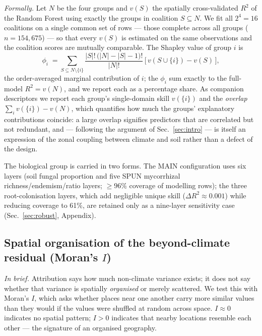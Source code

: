 \textit{Formally.} Let $N$ be the four groups and $v(S)$ the spatially
cross-validated $R^2$ of the Random Forest using exactly the groups in coalition
$S\subseteq N$. We fit all $2^{4}=16$ coalitions on a single common set of rows ---
those complete across all groups ($n=154{,}675$) --- so that every $v(S)$ is
estimated on the same observations and the coalition scores are mutually
comparable. The Shapley value of group $i$ is
\begin{equation}
  \phi_i \;=\!\! \sum_{S\subseteq N\setminus\{i\}}
  \frac{|S|!\,\bigl(|N|-|S|-1\bigr)!}{|N|!}\,
  \bigl[\,v(S\cup\{i\})-v(S)\,\bigr],
  \label{eq:shapley}
\end{equation}
the order-averaged marginal contribution of $i$; the $\phi_i$ sum exactly to the
full-model $R^2=v(N)$, and we report each as a percentage share. As companion
descriptors we report each group's single-domain skill $v(\{i\})$ and the
\emph{overlap} $\sum_i v(\{i\}) - v(N)$, which quantifies how much the groups'
explanatory contributions coincide: a large overlap signifies predictors that are
correlated but not redundant, and --- following the argument of
Sec.~\ref{sec:intro} --- is itself an expression of the zonal coupling between
climate and soil rather than a defect of the design.

The biological group is carried in two forms. The MAIN configuration uses six
layers (soil fungal proportion and five SPUN mycorrhizal
richness/endemism/ratio layers; $\geq96\%$ coverage of modelling rows); the three
\citet{Barcelo2023} root-colonisation layers, which add negligible unique skill
($\Delta R^2\approx0.001$) while reducing coverage to 61\%, are retained only as a
nine-layer sensitivity case (Sec.~\ref{sec:robust}, Appendix).

\subsection{Spatial organisation of the beyond-climate residual (Moran's $I$)}
\label{sec:moran}
\textit{In brief.} Attribution says how much non-climate variance exists; it does
not say whether that variance is spatially \emph{organised} or merely scattered.
We test this with Moran's $I$, which asks whether places near one another carry
more similar values than they would if the values were shuffled at random across
space. $I\approx0$ indicates no spatial pattern; $I>0$ indicates that nearby
locations resemble each other --- the signature of an organised geography.

